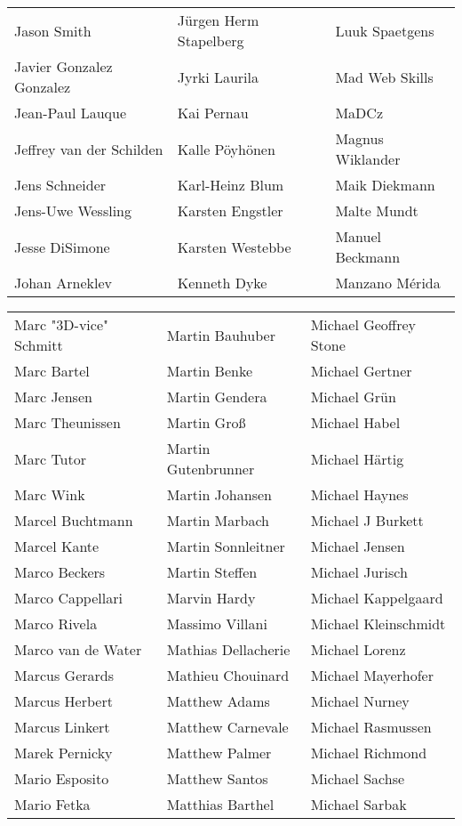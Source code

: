 \begin{tabular}{p{4.5cm}p{4.5cm}p{4.5cm}}
Jason Smith & Jürgen Herm Stapelberg & Luuk Spaetgens \\
Javier Gonzalez Gonzalez & Jyrki Laurila & Mad Web Skills \\
Jean-Paul Lauque & Kai Pernau & MaDCz \\
Jeffrey van der Schilden & Kalle Pöyhönen & Magnus Wiklander \\
Jens Schneider & Karl-Heinz Blum & Maik Diekmann \\
Jens-Uwe Wessling & Karsten Engstler & Malte Mundt \\
Jesse DiSimone & Karsten Westebbe & Manuel Beckmann \\
Johan Arneklev & Kenneth Dyke & Manzano Mérida \\
\end{tabular}
\newpage
\setlength{\tabcolsep}{1mm}
\begin{tabular}{p{4.5cm}p{4.5cm}p{4.5cm}}
Marc "3D-vice" Schmitt & Martin Bauhuber & Michael Geoffrey Stone \\
Marc Bartel & Martin Benke & Michael Gertner \\
Marc Jensen & Martin Gendera & Michael Grün \\
Marc Theunissen & Martin Groß & Michael Habel \\
Marc Tutor & Martin Gutenbrunner & Michael Härtig \\
Marc Wink & Martin Johansen & Michael Haynes \\
Marcel Buchtmann & Martin Marbach & Michael J Burkett \\
Marcel Kante & Martin Sonnleitner & Michael Jensen \\
Marco Beckers & Martin Steffen & Michael Jurisch \\
Marco Cappellari & Marvin Hardy & Michael Kappelgaard \\
Marco Rivela & Massimo Villani & Michael Kleinschmidt \\
Marco van de Water & Mathias Dellacherie & Michael Lorenz \\
Marcus Gerards & Mathieu Chouinard & Michael Mayerhofer \\
Marcus Herbert & Matthew Adams & Michael Nurney \\
Marcus Linkert & Matthew Carnevale & Michael Rasmussen \\
Marek Pernicky & Matthew Palmer & Michael Richmond \\
Mario Esposito & Matthew Santos & Michael Sachse \\
Mario Fetka & Matthias Barthel & Michael Sarbak \\

\end{tabular}
